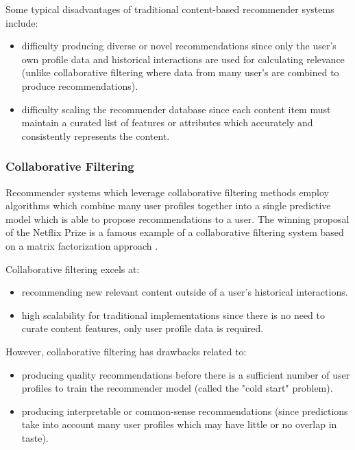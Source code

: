 Some typical disadvantages of traditional content-based recommender systems include:
\begin{itemize}
    \item difficulty producing diverse or novel recommendations since only the user's own profile data and historical interactions are used for calculating relevance (unlike collaborative filtering where data from many user's are combined to produce recommendations). 
    \item difficulty scaling the recommender database since each content item must maintain a curated list of features or attributes which accurately and consistently represents the content.
\end{itemize}

\subsubsection{Collaborative Filtering}

Recommender systems which leverage collaborative filtering methods employ algorithms which combine many user profiles together into a single predictive model which is able to propose recommendations to a user. The winning proposal of the Netflix Prize \cite{gomez2015netflix} is a famous example of a collaborative filtering system based on a matrix factorization approach \cite{wu2007collaborative}. 

Collaborative filtering excels at:
\begin{itemize}
    \item recommending new relevant content outside of a user's historical interactions.
    \item high scalability for traditional implementations since there is no need to curate content features, only user profile data is required. 
\end{itemize}

However, collaborative filtering has drawbacks related to:
\begin{itemize}
    \item producing quality recommendations before there is a sufficient number of user profiles to train the recommender model (called the "cold start" problem). 
    \item producing interpretable or common-sense recommendations (since predictions take into account many user profiles which may have little or no overlap in taste). 
\end{itemize}